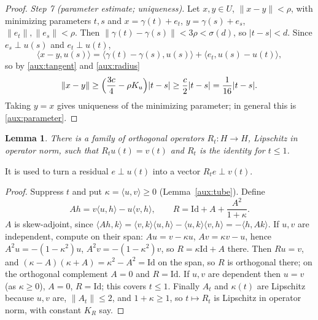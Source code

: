\documentclass[11pt]{article}
\newcommand{\norm}[1]{\lVert #1\rVert}
\newcommand{\ip}[2]{\langle #1,#2\rangle}
\newtheorem{lemma}[theorem]{Lemma}
\theoremstyle{definition}
\numberwithin{equation}{section}
\begin{document}
\begin{proof}
\emph{Step 7 (parameter estimate; uniqueness).} Let $x,y\in U$,
$\norm{x-y}<\rho$, with minimizing parameters $t,s$ and
$x=\gamma(t)+e_t$, $y=\gamma(s)+e_s$, $\norm{e_t},\norm{e_s}<\rho$.
Then $\norm{\gamma(t)-\gamma(s)}<3\rho<\sigma(d)$, so $|t-s|<d$. Since
$e_s\perp u(s)$ and $e_t\perp u(t)$,
\[
 \ip{x-y}{u(s)}=\ip{\gamma(t)-\gamma(s)}{u(s)}+\ip{e_t}{u(s)-u(t)},
\]
so by \eqref{aux:tangent} and \eqref{aux:radius}
\[
 \norm{x-y}\ge\Bigl(\frac{3c}{4}-\rho K_u\Bigr)|t-s|
 \ge\frac c2|t-s|=\frac1{16}|t-s|.
\]
Taking $y=x$ gives uniqueness of the minimizing parameter; in general
this is \eqref{aux:parameter}.
\end{proof}

\begin{lemma}\label{aux:rotation}
There is a family of orthogonal operators $R_t:H\to H$, Lipschitz
in operator norm, such that $R_tu(t)=v(t)$ and $R_t$ is the identity
for $t\le1$.
\end{lemma}

It is used to turn a residual $e\perp u(t)$ into a vector
$R_te\perp v(t)$.

\begin{proof}
Suppress $t$ and put $\kappa=\ip uv\ge0$ (Lemma~\ref{aux:tube}). Define
\[
 Ah=v\ip uh-u\ip vh,\qquad R=\mathrm{Id}+A+\frac{A^2}{1+\kappa}.
\]
$A$ is skew-adjoint, since
$\ip{Ah}{k}=\ip vk\ip uh-\ip uk\ip vh=-\ip h{Ak}$. If $u,v$ are
independent, compute on their span: $Au=v-\kappa u$,
$Av=\kappa v-u$, hence $A^2u=-(1-\kappa^2)u$, $A^2v=-(1-\kappa^2)v$, so
$R=\kappa\mathrm{Id}+A$ there. Then
$Ru=v$, and
$(\kappa-A)(\kappa+A)=\kappa^2-A^2=\mathrm{Id}$ on the span, so $R$ is
orthogonal there; on the orthogonal complement $A=0$ and
$R=\mathrm{Id}$. If $u,v$ are dependent then $u=v$ (as $\kappa\ge0$),
$A=0$, $R=\mathrm{Id}$; this covers $t\le1$. Finally $A_t$ and
$\kappa(t)$ are Lipschitz because $u,v$ are, $\norm{A_t}\le2$, and
$1+\kappa\ge1$, so $t\mapsto R_t$ is Lipschitz in operator norm, with
constant $K_R$ say.
\end{proof}
\end{document}
